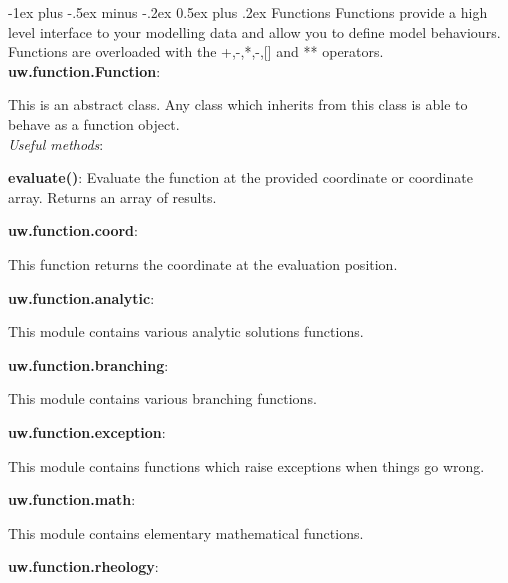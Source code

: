 \documentclass[10pt,landscape]{article}
\makeatletter
\renewcommand{\section}{\@startsection{section}{1}{0mm}%
                                {-1ex plus -.5ex minus -.2ex}%
                                {0.5ex plus .2ex}%
                                {\normalfont\large\bfseries}}
\makeatother
\begin{document}
\begin{multicols}{2}
\section{Functions}
Functions provide a high level interface to your modelling data and allow you to define model behaviours.
Functions are overloaded with the +,-,*,-,[] and ** operators.
\vfill
\columnbreak
\noindent\textbf{uw.function.Function}:
\begin{addmargin}[1em]{2em}
This is an abstract class. Any class which inherits from this class is able to behave as a function object.\\
\vspace{1mm}
\textit{Useful methods}:\\
\begin{addmargin}[1em]{2em}
\textbf{evaluate()}: Evaluate the function at the provided coordinate or coordinate array. Returns an array of results.\\
\end{addmargin}
\end{addmargin}
\vspace{1mm}
\noindent\textbf{uw.function.coord}:
\begin{addmargin}[1em]{2em}
This function returns the coordinate at the evaluation position.
\end{addmargin}
\vspace{1mm}
\noindent\textbf{uw.function.analytic}:
\begin{addmargin}[1em]{2em}
This module contains various analytic solutions functions.
\end{addmargin}
\vspace{1mm}
\noindent\textbf{uw.function.branching}:
\begin{addmargin}[1em]{2em}
This module contains various branching functions.
\end{addmargin}
\vspace{1mm}
\noindent\textbf{uw.function.exception}:
\begin{addmargin}[1em]{2em}
This module contains functions which raise exceptions when things go wrong.
\end{addmargin}
\vspace{1mm}
\noindent\textbf{uw.function.math}:
\begin{addmargin}[1em]{2em}
This module contains elementary mathematical functions.
\end{addmargin}
\vspace{1mm}
\noindent\textbf{uw.function.rheology}:
\begin{addmargin}[1em]{2em}

\end{addmargin}
\end{multicols}
\end{document}
